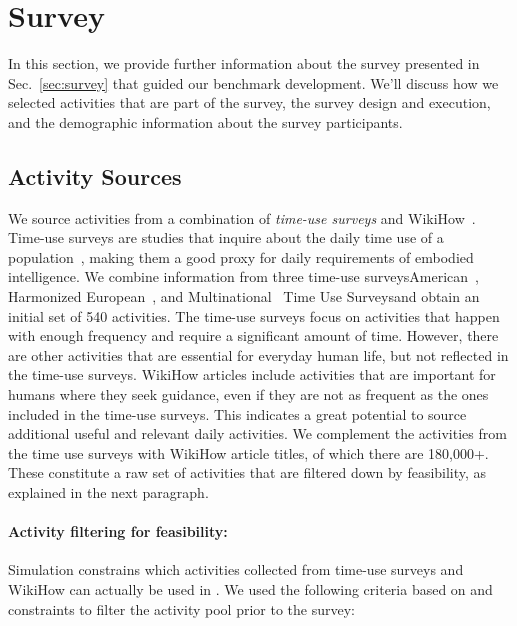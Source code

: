 \section{Survey}
\label{as:survey}

In this section, we provide further information about the survey presented in Sec.~\ref{sec:survey} that guided our benchmark development. We'll discuss how we selected activities that are part of the survey, the survey design and execution, and the demographic information about the survey participants.

\subsection{Activity Sources} 
We source activities from a combination of \textit{time-use surveys} and WikiHow~\cite{koupaee2018wikihow}. Time-use surveys are studies that inquire about the daily time use of a population~\cite{atus}, making them a good proxy for daily requirements of embodied intelligence. We combine information from three time-use surveys\textemdash American~\cite{atus}, Harmonized European~\cite{hetus}, and Multinational~\cite{mtus} Time Use Surveys\textemdash and obtain an initial set of 540 activities. 
The time-use surveys focus on activities that happen with enough frequency and require a significant amount of time. However, there are other activities that are essential for everyday human life, but not reflected in the time-use surveys.
WikiHow articles include activities that are important for humans where they seek guidance, even if they are not as frequent as the ones included in the time-use surveys. 
This indicates a great potential to source additional useful and relevant daily activities. 
We complement the activities from the time use surveys with WikiHow article titles, of which there are 180,000+. These constitute a raw set of activities that are filtered down by feasibility, as explained in the next paragraph. 

\paragraph{Activity filtering for feasibility:} Simulation constrains which activities collected from time-use surveys and WikiHow can actually be used in \benchmark. We used the following criteria based on \simulator and \bddl constraints to filter the activity pool prior to the survey: 

